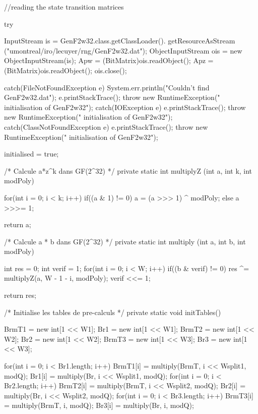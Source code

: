 \begin{code}
\begin{hide}
{{      //reading the state transition matrices

      try {
         InputStream is = GenF2w32.class.getClassLoader().
                          getResourceAsStream ("umontreal/iro/lecuyer/rng/GenF2w32.dat");
         ObjectInputStream ois = new ObjectInputStream(is);
         Apw = (BitMatrix)ois.readObject();
         Apz = (BitMatrix)ois.readObject();
         ois.close();

      } catch(FileNotFoundException e) {
         System.err.println("Couldn't find GenF2w32.dat");
         e.printStackTrace();
         throw new RuntimeException("  initialisation of GenF2w32");
      } catch(IOException e) {
         e.printStackTrace();
         throw new RuntimeException("  initialisation of GenF2w32");
      } catch(ClassNotFoundException e) {
         e.printStackTrace();
         throw new RuntimeException("  initialisation of GenF2w32");
      }

      initialised = true;
   }



   /*
     Calcule a*z^k dans GF(2^32)
   */
   private static int multiplyZ (int a, int k, int modPoly) {
      for(int i = 0; i < k; i++)
         if((a & 1) != 0)
            a = (a >>> 1) ^ modPoly;
         else
            a >>>= 1;

      return a;
   }

   /*
     Calcule a * b dans GF(2^32)
   */
   private static int multiply (int a, int b, int modPoly) {
      int res = 0;
      int verif = 1;
      for(int i = 0; i < W; i++) {
         if((b & verif) != 0)
            res ^= multiplyZ(a, W - 1 - i, modPoly);
         verif <<= 1;
      }

      return res;
   }

   /*
     Initialise les tables de pre-calculs
   */
   private static void initTables() {
      BrmT1 = new int[1 << W1];
      Br1 = new int[1 << W1];
      BrmT2 = new int[1 << W2];
      Br2 = new int[1 << W2];
      BrmT3 = new int[1 << W3];
      Br3 = new int[1 << W3];

      for(int i = 0; i < Br1.length; i++) {
         BrmT1[i] = multiply(BrmT, i << Wsplit1, modQ);
         Br1[i] = multiply(Br, i << Wsplit1, modQ);
      }
      for(int i = 0; i < Br2.length; i++) {
         BrmT2[i] = multiply(BrmT, i << Wsplit2, modQ);
         Br2[i] = multiply(Br, i << Wsplit2, modQ);
      }
      for(int i = 0; i < Br3.length; i++) {
         BrmT3[i] = multiply(BrmT, i, modQ);
         Br3[i] = multiply(Br, i, modQ);
      }

}}
\end{hide}
\end{code}
